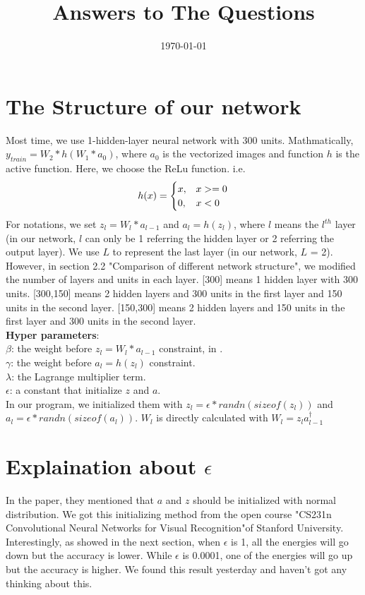 \documentclass{article}
\title{Answers to The Questions}
\date{\today}
\begin{document}
\maketitle

\section{The Structure of our network}
Most time, we use 1-hidden-layer neural network with 300 units. Mathmatically, $y_{train} = W_2*h(W_1*a_0)$, where $a_0$ is the vectorized images and function $h$ is the active function. Here, we choose the ReLu function. i.e.
\begin{equation}
h(x) = \begin{cases}
x, & x>=0 \cr
0, & x<0 
\end{cases}
\end{equation}
For notations, we set $z_l = W_l * a_{l-1}$ and $a_l = h(z_l)$, where $l$ means the $l^{th}$  layer (in our network, $l$ can only be 1 referring the hidden layer or 2 referring the output layer). We use $L$ to represent the last layer (in our network, $L$ = 2). \\
However, in section 2.2 "Comparison of different network structure", we modified the number of layers and units in each layer. [300] means 1 hidden layer with 300 units. [300,150] means 2 hidden layers and 300 units in the first layer and 150 units in the second layer. [150,300] means 2 hidden layers and 150 units in the first layer and 300 units in the second layer.\\
\newline
\textbf{Hyper parameters}:\\
$\beta$: the weight before $z_l=W_l*a_{l-1}$ constraint, in .\\
$\gamma$: the weight before $a_l = h(z_l)$ constraint. \\
$\lambda$: the Lagrange multiplier term. \\
$\epsilon$: a constant that initialize $z$ and $a$.\\
In our program, we initialized them with $z_l = \epsilon*randn(sizeof(z_l))$  and $a_l = \epsilon*randn(sizeof(a_l))$.  $W_l$ is directly calculated with $W_l = z_la_{l-1}^\dagger$ 

\section{Explaination about $\epsilon$}
In the paper, they mentioned that $a$ and $z$ should be initialized with normal distribution.
We got this initializing method from the open course "CS231n Convolutional Neural Networks for Visual Recognition"of Stanford University.
Interestingly, as showed in the next section, when $\epsilon$ is 1, all the energies will go down but the accuracy is lower. While $\epsilon$ is 0.0001, one of the energies will go up but the accuracy is higher. We found this result yesterday and haven't got any thinking about this.
\end{document}
